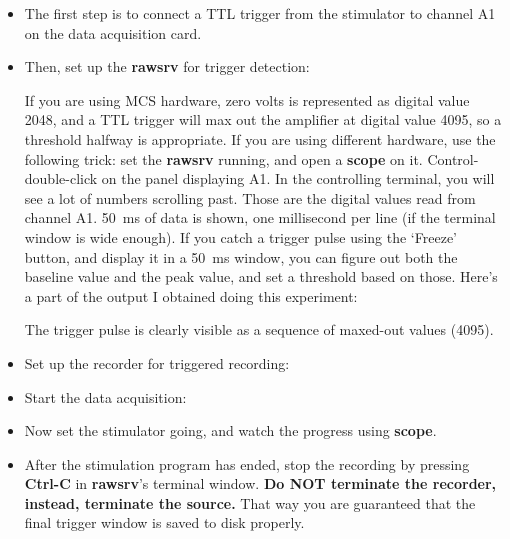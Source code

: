 \documentclass[12pt,oneside]{book}
\def\prog#1{{\bf #1}}
\def\intr{{\bf Ctrl-C}\xspace}
\begin{document}
\begin{itemize}
\item The
first step is to connect a TTL trigger from the stimulator to channel
A1 on the data acquisition card.
\item Then, set up the \prog{rawsrv} for trigger detection:
\begin{quotation}
\uprompt{}
\end{quotation}
If you are using MCS hardware, zero volts is represented as digital
value 2048, and a TTL trigger will max out the amplifier at digital
value 4095, so a threshold halfway is appropriate. If you are using
different hardware, use the following trick: set the \prog{rawsrv}
running, and open a \prog{scope} on it. Control-double-click on the
panel displaying A1. In the controlling terminal, you will see a lot
of numbers scrolling past. Those are the digital values read from
channel A1. 50~ms of data is shown, one millisecond per line (if the
terminal window is wide enough). If you catch a trigger pulse using
the `Freeze' button, and display it in a 50~ms window, you can figure
out both the baseline value and the peak value, and set a threshold
based on those. Here's a part of the output I obtained doing this
experiment:
\begin{quotation}
\scriptsize{}
\end{quotation}
The trigger pulse is clearly visible as a sequence of maxed-out values
(4095).
\item Set up the recorder for triggered recording:
\begin{quotation}
\uprompt{}
\end{quotation}
\item Start the data acquisition:
\begin{quotation}
\end{quotation}
\item Now set the stimulator going, and watch the progress using
\prog{scope}.
\item After the stimulation program has ended, stop the recording by
pressing \intr in \prog{rawsrv}'s terminal window. {\bf Do NOT
terminate the recorder, instead, terminate the source.} That way you are
guaranteed that the final trigger window is saved to disk properly.
\end{itemize}
\end{document}
